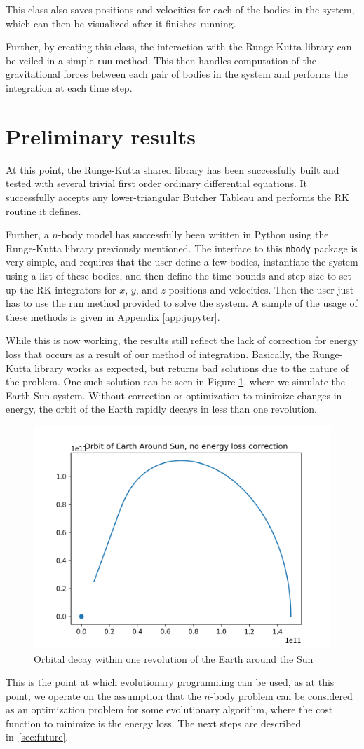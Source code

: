 \documentclass[onecolumn,titlepage,letterpaper,10pt]{article}
\begin{document}
This class also saves positions and velocities for each of the bodies in the
system, which can then be visualized after it finishes running.

Further, by creating this class, the interaction with the Runge-Kutta library
can be veiled in a simple \texttt{run} method. This then handles computation of
the gravitational forces between each pair of bodies in the system and performs
the integration at each time step.

\section{Preliminary results}
At this point, the Runge-Kutta shared library has been successfully built and
tested with several trivial first order ordinary differential equations. It
successfully accepts any lower-triangular Butcher Tableau and performs the RK
routine it defines.

Further, a $n$-body model has successfully been written in Python using the
Runge-Kutta library previously mentioned. The interface to this \texttt{nbody}
package is very simple, and requires that the user define a few bodies,
instantiate the system using a list of these bodies, and then define the
time bounds and step size to set up the RK integrators for $x$, $y$, and $z$
positions and velocities. Then the user just has to use the run method provided
to solve the system. A sample of the usage of these methods is given in Appendix
\ref{app:jupyter}.

While this is now working, the results still reflect the lack of correction for
energy loss that occurs as a result of our method of integration. Basically, the
Runge-Kutta library works as expected, but returns bad solutions due to the
nature of the problem. One such solution can be seen in Figure
\ref{fig:decayingorbits}, where we simulate the Earth-Sun system. Without
correction or optimization to minimize changes in energy, the orbit of the Earth
rapidly decays in less than one revolution.
%
\begin{figure}[ht!]
    \centering
    \includegraphics[width=0.5\linewidth]{images/decayingorbits.png}
    \caption{Orbital decay within one revolution of the Earth around the Sun}
    \label{fig:decayingorbits}
\end{figure}
%
This is the point at which evolutionary programming can
be used, as at this point, we operate on the assumption that the $n$-body
problem can be considered as an optimization problem for some evolutionary
algorithm, where the cost function to minimize is the energy loss.
The next steps are described in~\ref{sec:future}.
\end{document}
